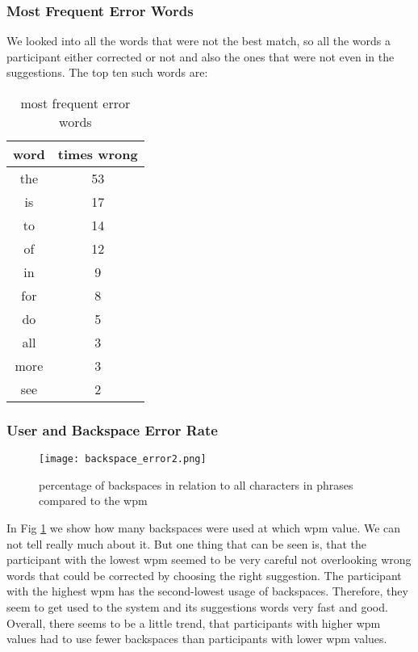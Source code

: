 \subsubsection{Most Frequent Error Words}
We looked into all the words that were not the best match, so all the words a participant either corrected or not and also the ones that were not even in the suggestions. The top ten such words are:
\begin{table}[ht!]
    \centering
    \caption{most frequent error words}
    \begin{tabular}{cc} \toprule
        word&times wrong\\ \midrule
        the & 53\\
        is & 17\\
        to & 14\\
        of & 12\\
        in & 9\\
        for & 8\\
        do & 5\\
        all & 3\\
        more & 3\\
        see & 2\\
        \bottomrule
    \end{tabular}
    \label{tab:error_words}
\end{table}

\subsubsection{User and Backspace Error Rate}
\begin{figure}[H]
    \centering
    \texttt{[image: backspace\_error2.png]}
    \caption{percentage of backspaces in relation to all characters in phrases compared to the wpm}
    \label{fig:error_backspace}
\end{figure}

In Fig \ref{fig:error_backspace} we show how many backspaces were used at which wpm value. We can not tell really much about it. But one thing that can be seen is, that the participant with the lowest wpm seemed to be very careful not overlooking wrong words that could be corrected by choosing the right suggestion. The participant with the highest wpm has the second-lowest usage of backspaces. Therefore, they seem to get used to the system and its suggestions words very fast and good.\\
Overall, there seems to be a little trend, that participants with higher wpm values had to use fewer backspaces than participants with lower wpm values.

